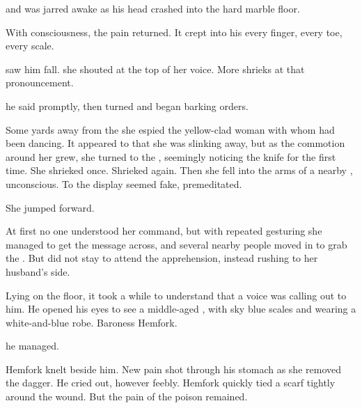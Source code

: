 \begin{garbage}
\prikker and was jarred awake as his head crashed into the hard marble floor. 

With consciousness, the pain returned. It crept into his every finger, every toe, every scale. 

\Tiroco{} saw him fall. 
 she shouted at the top of her voice. 
More shrieks at that pronouncement. 

 he said promptly, then turned and began barking orders. 

Some yards away from the \rayuth she espied the yellow-clad woman with whom \Icor{} had been dancing. It appeared to \Tiroco{} that she was slinking away, but as the commotion around her grew, she turned to the \rayuth, seemingly noticing the knife for the first time. She shrieked once. Shrieked again. Then she fell into the arms of a nearby \dax, unconscious. 
To \Tiroco{} the display seemed fake, premeditated. 

She jumped forward. 

At first no one understood her command, but with repeated gesturing she managed to get the message across, and several nearby people moved in to grab the \human. But \Tiroco{} did not stay to attend the apprehension, instead rushing to her husband's side. 


Lying on the floor, it took \Icor{} a while to understand that a voice was calling out to him. 
He opened his eyes to see a middle-aged \sphyle{}, with sky blue scales and wearing a white-and-blue robe. Baroness \Risvet{} Hemfork. 

\ta{\Tiroco\prikker} he managed. 

 Hemfork knelt beside him.  New pain shot through his stomach as she removed the dagger. He cried out, however feebly. Hemfork quickly tied a scarf tightly around the wound. But the pain of the poison remained. 


\end{garbage}
